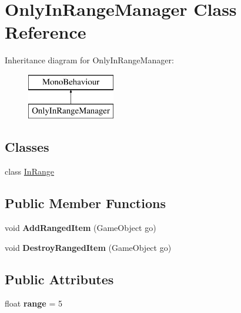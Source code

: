 \hypertarget{class_only_in_range_manager}{}\section{Only\+In\+Range\+Manager Class Reference}
\label{class_only_in_range_manager}
Inheritance diagram for Only\+In\+Range\+Manager\+:\begin{figure}[H]
\begin{center}
\leavevmode
\includegraphics[height=2.000000cm]{class_only_in_range_manager}
\end{center}
\end{figure}
\subsection*{Classes}
\begin{DoxyCompactItemize}
\item 
class \hyperlink{class_only_in_range_manager_1_1_in_range}{In\+Range}
\end{DoxyCompactItemize}
\subsection*{Public Member Functions}
\begin{DoxyCompactItemize}
\item 
\mbox{\label{class_only_in_range_manager_a2c52609beffc53211458f1118ebfb969}} 
void {\bfseries Add\+Ranged\+Item} (Game\+Object go)
\item 
\mbox{\label{class_only_in_range_manager_aaf1f9303c9fc40e96d1ec9e55e3a9129}} 
void {\bfseries Destroy\+Ranged\+Item} (Game\+Object go)
\end{DoxyCompactItemize}
\subsection*{Public Attributes}
\begin{DoxyCompactItemize}
\item 
\mbox{\label{class_only_in_range_manager_adebbb2a7204de0f6f5428cb9adeeb3f3}} 
float {\bfseries range} = 5
\end{DoxyCompactItemize}
